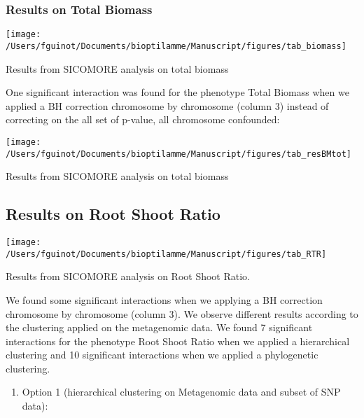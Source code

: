 \documentclass[]{book}
\providecommand{\tightlist}{%
  \setlength{\itemsep}{0pt}\setlength{\parskip}{0pt}}
\begin{document}
\hypertarget{results-on-total-biomass}{%
\subsubsection{Results on Total Biomass}\label{results-on-total-biomass}}

\begin{center}\texttt{[image: /Users/fguinot/Documents/bioptilamme/Manuscript/figures/tab\_biomass]} \end{center}

\label{tab:tabBMtot}Results from SICOMORE analysis on total biomass

One significant interaction was found for the phenotype Total Biomass
when we applied a BH correction chromosome by chromosome (column 3)
instead of correcting on the all set of p-value, all chromosome
confounded:

\begin{center}\texttt{[image: /Users/fguinot/Documents/bioptilamme/Manuscript/figures/tab\_resBMtot]} \end{center}

\label{tab:tabresBMtot}Results from SICOMORE analysis on total biomass

\hypertarget{results-on-root-shoot-ratio}{%
\subsection{Results on Root Shoot Ratio}\label{results-on-root-shoot-ratio}}

\begin{center}\texttt{[image: /Users/fguinot/Documents/bioptilamme/Manuscript/figures/tab\_RTR]} \end{center}

\label{tab:tabRTR}Results from SICOMORE analysis on Root Shoot Ratio.

We found some significant interactions when we applying a BH correction
chromosome by chromosome (column 3). We observe different results
according to the clustering applied on the metagenomic data. We found 7
significant interactions for the phenotype Root Shoot Ratio when we
applied a hierarchical clustering and 10 significant interactions when
we applied a phylogenetic clustering.

\begin{enumerate}
\def\labelenumi{\arabic{enumi}.}
\tightlist
\item
  Option 1 (hierarchical clustering on Metagenomic data and subset of SNP data):
\end{enumerate}
\end{document}
